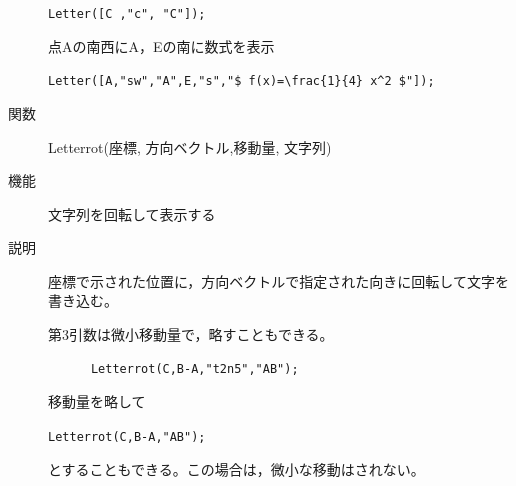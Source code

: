 \documentclass[papersize,a4paper,12pt,uplatex]{jsarticle}
\begin{document}
\begin{description}
\hspace{10mm}  \verb|Letter([C ,"c", "C"]);|

点Aの南西にA，Eの南に数式を表示

\hspace{10mm}  \verb|Letter([A,"sw","A",E,"s","$ f(x)=\frac{1}{4} x^2 $"]);| 

\vspace{\baselineskip}
\hypertarget{letterrot}{}\item[関数]  Letterrot(座標, 方向ベクトル,移動量, 文字列)
\item[機能]  文字列を回転して表示する
\item[説明]  座標で示された位置に，方向ベクトルで指定された向きに回転して文字を書き込む。

第3引数は微小移動量で，略すこともできる。

\begin{verbatim}
      Letterrot(C,B-A,"t2n5","AB");
\end{verbatim}

移動量を略して

\hspace{10mm}  \verb|Letterrot(C,B-A,"AB");|

とすることもできる。この場合は，微小な移動はされない。


\end{description}
\end{document}
